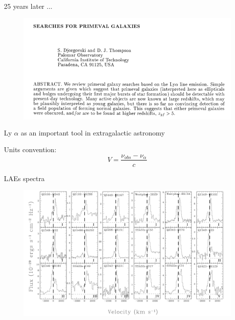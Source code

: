 \documentclass{beamer}
\begin{document}
\begin{frame}
\LARGE{25 years later ...}
\end{frame}

\begin{frame}
\begin{figure}
\includegraphics[scale=0.4]{Figures/DJT.png}
\end{figure}
\end{frame}

\begin{frame}{Ly $\alpha$ as an important tool in extragalactic astronomy}

\end{frame}

\begin{frame}{Units convention:}
\begin{equation}
V = \dfrac{\nu_{obs} - \nu_{\alpha}}{c}
\end{equation}
\end{frame}

\begin{frame}{LAEs spectra}
\begin{figure}
\includegraphics[scale=0.3]{Figures/kulas.png}
\end{figure}
\end{frame}
\end{document}
